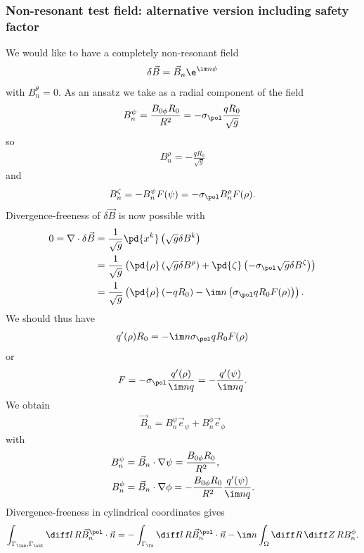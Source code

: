 \subsubsection{Non-resonant test field: alternative version including safety factor}

We would like to have a completely non-resonant field
\begin{gather*}
  \delta \vec{B} = \vec{B}_{n} \e^{\im n \phi}
\end{gather*}
with $B_{n}^{\theta} = 0$. As an ansatz we take as a radial component of the field
\begin{gather}
  B_{n}^{\psi} = \frac{B_{0 \phi} R_{0}}{R^{2}} = -\sigma_{\pol} \frac{q R_{0}}{\sqrt{g}}
\end{gather}
so
\begin{gather*}
  B_{n}^{\rho} = -\frac{q R_{0}}{\sqrt{g}}
\end{gather*}
and
\begin{gather*}
  B_{n}^{\zeta} = -B_{n}^{\psi} F(\psi) = -\sigma_{\pol} B_{n}^{\rho} F(\rho).
\end{gather*}
Divergence-freeness of $\delta \vec{B}$ is now possible with
\begin{align*}
  0 = \nabla \cdot \delta \vec{B} &= \frac{1}{\sqrt{g}} \pd{x^{k}} \left( \sqrt{g} \delta B^{k} \right) \\
  &= \frac{1}{\sqrt{g}} \left( \pd{\rho} \left( \sqrt{g} \delta B^{\rho} \right) + \pd{\zeta} \left( -\sigma_{\pol} \sqrt{g} \delta B^{\zeta} \right) \right) \\
  &= \frac{1}{\sqrt{g}} \left(\pd{\rho} \left( -q R_{0} \right) - \im n \left( \sigma_{\pol} q R_{0} F(\rho) \right) \right).
\end{align*}
We should thus have 
\begin{gather*}
  q' (\rho) R_{0} = -\im n \sigma_{\pol} q R_{0} F(\rho)
\end{gather*}
or
\begin{gather*}
  F = -\sigma_{\pol} \frac{q' (\rho)}{\im n q} = -\frac{q' (\psi)}{\im n q}.
\end{gather*}
We obtain
\begin{gather*}
  \vec{B}_{n} = B_{n}^{\psi} \vec{e}_{\psi} + B_{n}^{\phi} \vec{e}_{\phi}
\end{gather*}
with
\begin{align*}
  B_{n}^{\psi} &= \vec{B}_{n} \cdot \nabla \psi = \frac{B_{0 \phi} R_{0}}{R^{2}}, \\
  B_{n}^{\phi} &= \vec{B}_{n} \cdot \nabla \phi = -\frac{B_{0 \phi} R_{0}}{R^{2}} \frac{q' (\psi)}{\im n q}.
\end{align*}
Divergence-freeness in cylindrical coordinates gives
\begin{gather*}
  \int_{\Gamma_{\inw}, \Gamma_{\out}} \diff l \, R \vec{B}_{n}^{\pol} \cdot \vec{n} = -\int_{\Gamma_{\fs}} \diff l \, R \vec{B}_{n}^{\pol} \cdot \vec{n} - \im n \int_{\Omega} \diff R \, \diff Z \, R B_{n}^{\phi}.
\end{gather*}
